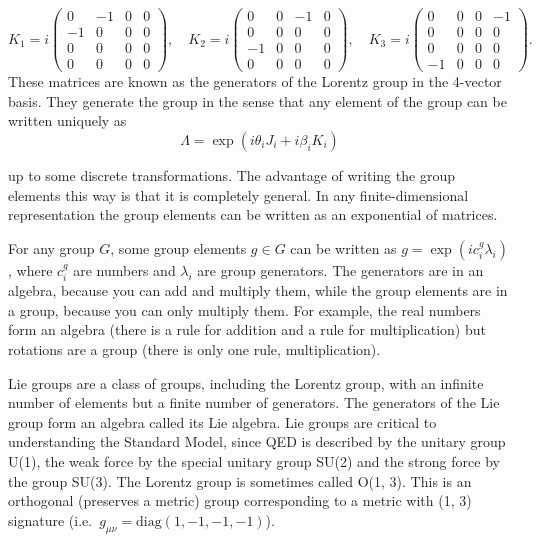 \documentclass[11pt]{article}
\theoremstyle{definition}
\begin{document}
\[
K_1 = i\begin{pmatrix}
0 & -1 & 0 & 0 \\
-1 & 0 & 0 & 0 \\
0 & 0 & 0 & 0 \\
0 & 0 & 0 & 0
\end{pmatrix}, \quad
K_2 = i\begin{pmatrix}
0 & 0 & -1 & 0 \\
0 & 0 & 0 & 0 \\
-1 & 0 & 0 & 0 \\
0 & 0 & 0 & 0
\end{pmatrix}, \quad
K_3 = i\begin{pmatrix}
0 & 0 & 0 & -1 \\
0 & 0 & 0 & 0 \\
0 & 0 & 0 & 0 \\
-1 & 0 & 0 & 0
\end{pmatrix}.
\]
These matrices are known as the generators of the Lorentz group in the 4-vector basis. They generate the group in the sense that any element of the group can be written uniquely as
\begin{equation}
    \Lambda = \exp(i\theta_i J_i + i\beta_i K_i)
\end{equation}

up to some discrete transformations. The advantage of writing the group elements this way is that it is completely general. In any finite-dimensional representation the group elements can be written as an exponential of matrices.

For any group \( G \), some group elements \( g \in G \) can be written as \( g = \exp(i c_i^g \lambda_i) \), where \( c_i^g \) are numbers and \( \lambda_i \) are group generators. The generators are in an algebra, because you can add and multiply them, while the group elements are in a group, because you can only multiply them. For example, the real numbers form an algebra (there is a rule for addition and a rule for multiplication) but rotations are a group (there is only one rule, multiplication).

Lie groups are a class of groups, including the Lorentz group, with an infinite number of elements but a finite number of generators. The generators of the Lie group form an algebra called its Lie algebra. Lie groups are critical to understanding the Standard Model, since QED is described by the unitary group U(1), the weak force by the special unitary group SU(2) and the strong force by the group SU(3). The Lorentz group is sometimes called O(1, 3). This is an orthogonal (preserves a metric) group corresponding to a metric with (1, 3) signature (i.e.\ \( g_{\mu\nu} = \text{diag}(1, -1, -1, -1) \)).
\end{document}
